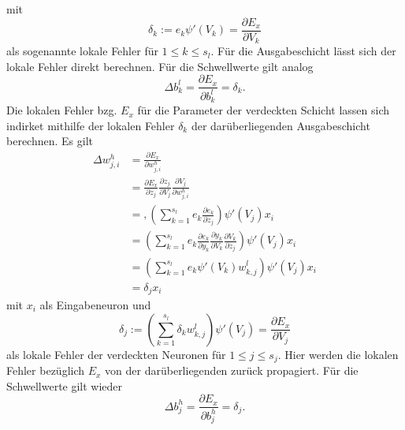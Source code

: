 mit 
\begin{equation*}
    \label{eq:delta_out}
    \delta_k:= e_k \psi'(V_k)=\frac{\partial E_x}{\partial V_k}
\end{equation*}
als sogenannte lokale Fehler für $1 \leq k \leq s_l$. Für die Ausgabeschicht lässt sich der lokale Fehler direkt berechnen.
Für die Schwellwerte gilt analog
\begin{equation*}
    \Delta b_k^l =  \frac{\partial E_x}{\partial b_{k}^l} 
                 =  \delta_k.
\end{equation*}
Die lokalen Fehler bzg. $E_x$ für die Parameter der verdeckten Schicht lassen sich indirket mithilfe der lokalen Fehler $\delta_k$ der darüberliegenden Ausgabeschicht berechnen. Es gilt
\begin{align*}
    \Delta w_{j,i}^h &= \frac{\partial E_x}{\partial w_{j,i}^h} \\
                     &= \frac{\partial E_x}{\partial z_{j}}
                            \frac{\partial z_j}{\partial V_j} 
                            \frac{\partial V_j}{\partial w_{j,i}^h} \\
                    &= ,\left( \sum_{k=1}^{s_l} e_k \frac{\partial e_k}{\partial z_j}\right) \psi'(V_j) x_i \\
                    &= \left( \sum_{k=1}^{s_l} e_k \frac{\partial e_k}{\partial y_k} \frac{\partial y_k}{\partial V_k} \frac{\partial V_k}{\partial z_j}\right) \psi'(V_j) x_i \\
                    &= \left( \sum_{k=1}^{s_l} e_k \psi'(V_k) w_{k,j}^l \right) \psi'(V_j) x_i \\
                    &=  \delta_j x_i
\end{align*}
mit $x_i$ als Eingabeneuron und
\begin{equation*}
    \label{eq:delta_hidden}
    \delta_j:= \left(\sum_{k=1}^{s_l} \delta_k w_{k,j}^l\right) \psi'(V_j)=\frac{\partial E_x}{\partial V_j}
\end{equation*}
als lokale Fehler der verdeckten Neuronen für $1 \leq j \leq s_j$. Hier werden die lokalen Fehler bezüglich $E_x$ von der darüberliegenden zurück propagiert.
Für die Schwellwerte gilt wieder
\begin{equation*}
    \Delta b_j^h =  \frac{\partial E_x}{\partial b_{j}^h} 
                 =  \delta_j.
\end{equation*}

